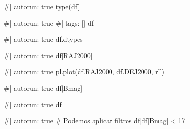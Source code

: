 \documentclass[
  letterpaper,
  DIV=11,
  numbers=noendperiod]{scrreprt}
\newenvironment{Shaded}{\begin{snugshade}}{\end{snugshade}}
\newcommand{\NormalTok}[1]{\textcolor[rgb]{0.00,0.23,0.31}{#1}}
\begin{document}
\begin{Shaded}
\begin{Highlighting}[]
\NormalTok{\#| autorun: true}
\NormalTok{type(df)}
\end{Highlighting}
\end{Shaded}

\begin{Shaded}
\begin{Highlighting}[]
\NormalTok{\#| autorun: true}
\NormalTok{\#| tags: []}
\NormalTok{df}
\end{Highlighting}
\end{Shaded}

\begin{Shaded}
\begin{Highlighting}[]
\NormalTok{\#| autorun: true}
\NormalTok{df.dtypes}
\end{Highlighting}
\end{Shaded}

\begin{Shaded}
\begin{Highlighting}[]
\NormalTok{\#| autorun: true}
\NormalTok{df[\textquotesingle{}RAJ2000\textquotesingle{}]}
\end{Highlighting}
\end{Shaded}

\begin{Shaded}
\begin{Highlighting}[]
\NormalTok{\#| autorun: true}
\NormalTok{pl.plot(df.RAJ2000, df.DEJ2000, \textquotesingle{}r\^{}\textquotesingle{})}
\end{Highlighting}
\end{Shaded}

\begin{Shaded}
\begin{Highlighting}[]
\NormalTok{\#| autorun: true}
\NormalTok{df[\textquotesingle{}Bmag\textquotesingle{}]}
\end{Highlighting}
\end{Shaded}

\begin{Shaded}
\begin{Highlighting}[]
\NormalTok{\#| autorun: true}
\NormalTok{df}
\end{Highlighting}
\end{Shaded}

\begin{Shaded}
\begin{Highlighting}[]
\NormalTok{\#| autorun: true}
\NormalTok{\# Podemos aplicar filtros}
\NormalTok{df[df[\textquotesingle{}Bmag\textquotesingle{}] \textless{} 17]}
\end{Highlighting}
\end{Shaded}
\end{document}
